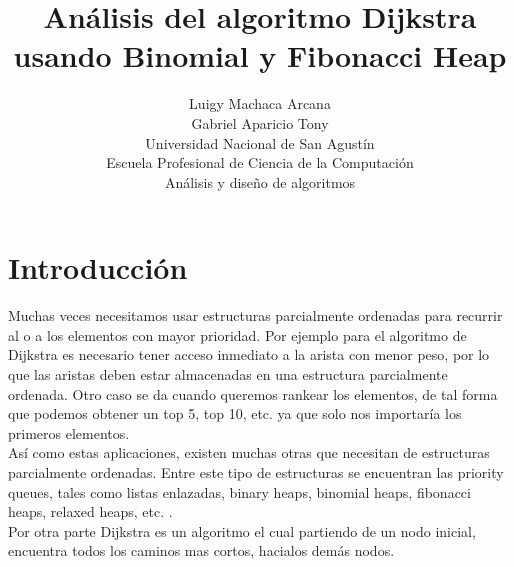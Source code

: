 \documentclass[a4paper,twocolumn,10pt]{article}
\title{Análisis del algoritmo Dijkstra usando Binomial y Fibonacci Heap }
\author{Luigy Machaca Arcana\\Gabriel Aparicio Tony\\Universidad Nacional de San Agustín 
	\\ Escuela Profesional de Ciencia de la Computación 
	\\ Análisis y diseño de algoritmos}
\begin{document}


\section{Introducción}
Muchas veces necesitamos usar estructuras parcialmente ordenadas para recurrir al o a los elementos 
con mayor prioridad. Por ejemplo para el algoritmo de Dijkstra es necesario tener acceso inmediato 
a la arista con menor peso, por lo que las aristas deben estar almacenadas en una estructura 
parcialmente ordenada. Otro caso se da cuando queremos rankear los elementos, 
de tal forma que podemos obtener un top 5, top 10, etc. ya que solo nos 
importaría los primeros elementos. \\
Así como estas aplicaciones, existen muchas otras que necesitan 
de estructuras parcialmente ordenadas. Entre este tipo de estructuras se encuentran las priority queues, 
tales como listas enlazadas, binary heaps, binomial heaps, fibonacci heaps, relaxed heaps, etc. \cite{princeton_slides_binomial}.\\

Por otra parte Dijkstra es un algoritmo el cual partiendo de un nodo inicial, encuentra todos los caminos mas cortos,
hacialos demás nodos.
\end{document}
